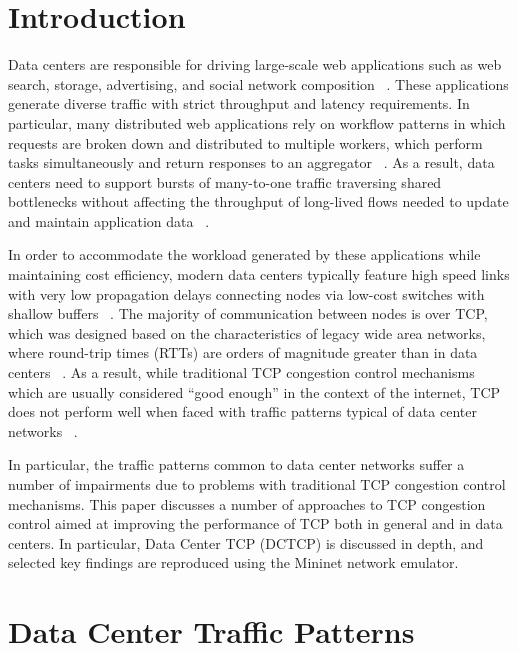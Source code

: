 \section{Introduction}

Data centers are responsible for driving large-scale web applications such as web search, storage, advertising, and social network composition ~\cite{chen_understanding_2009, alizadeh_data_2010}. These applications generate diverse traffic with strict throughput and latency requirements. In particular, many distributed web applications rely on workflow patterns in which requests are broken down and distributed to multiple workers, which perform tasks simultaneously and return responses to an aggregator ~\cite{chen_understanding_2009, alizadeh_data_2010}. As a result, data centers need to support bursts of many-to-one traffic traversing shared bottlenecks without affecting the throughput of long-lived flows needed to update and maintain application data ~\cite{alizadeh_data_2010}.

In order to accommodate the workload generated by these applications while maintaining cost efficiency, modern data centers typically feature high speed links with very low propagation delays connecting nodes via low-cost switches with shallow buffers ~\cite{chen_understanding_2009, hamilton_designing_2007, alizadeh_data_2010}. The majority of communication between nodes is over TCP, which was designed based on the characteristics of legacy wide area networks, where round-trip times (RTTs) are orders of magnitude greater than in data centers ~\cite{chen_understanding_2009}. As a result, while traditional TCP congestion control mechanisms which are usually considered ``good enough'' in the context of the internet, TCP does not perform well when faced with traffic patterns typical of data center networks ~\cite{chen_understanding_2009, phanishayee_measurement_2008}. 

In particular, the traffic patterns common to data center networks suffer a number of impairments due to problems with traditional TCP congestion control mechanisms. This paper discusses a number of approaches to TCP congestion control aimed at improving the performance of TCP both in general and in data centers. In particular, Data Center TCP (DCTCP) is discussed in depth, and selected key findings are reproduced using the Mininet network emulator.

\section{Data Center Traffic Patterns}

